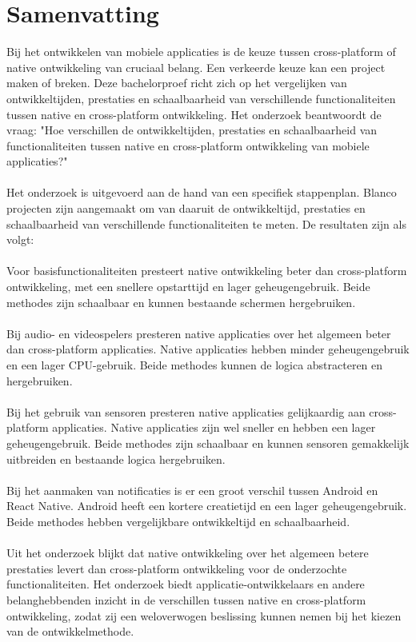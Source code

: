 \chapter{Samenvatting}
Bij het ontwikkelen van mobiele applicaties is de keuze tussen cross-platform of native 
ontwikkeling van cruciaal belang. Een verkeerde keuze kan een project 
maken of breken. Deze bachelorproef richt zich op het vergelijken van 
ontwikkeltijden, prestaties en schaalbaarheid van verschillende functionaliteiten tussen
native en cross-platform ontwikkeling. Het onderzoek beantwoordt de vraag: "Hoe verschillen 
de ontwikkeltijden, prestaties en schaalbaarheid van functionaliteiten tussen native en 
cross-platform ontwikkeling van mobiele applicaties?"
\\\\
Het onderzoek is uitgevoerd aan de hand van een specifiek stappenplan. Blanco projecten 
zijn aangemaakt om van daaruit de ontwikkeltijd, prestaties en schaalbaarheid van verschillende 
functionaliteiten te meten. De resultaten zijn als volgt:
\\\\
Voor basisfunctionaliteiten presteert native ontwikkeling beter dan cross-platform 
ontwikkeling, met een snellere opstarttijd en lager geheugengebruik. Beide methodes 
zijn schaalbaar en kunnen bestaande schermen hergebruiken.
\\\\
Bij audio- en videospelers presteren native applicaties over het algemeen beter dan 
cross-platform applicaties. Native applicaties hebben minder geheugengebruik en een lager 
CPU-gebruik. Beide methodes kunnen de logica abstracteren en hergebruiken.
\\\\
Bij het gebruik van sensoren presteren native applicaties gelijkaardig aan cross-platform applicaties. 
Native applicaties zijn wel sneller en hebben een lager geheugengebruik. Beide methodes zijn 
schaalbaar en kunnen sensoren gemakkelijk uitbreiden en bestaande logica hergebruiken.
\\\\
Bij het aanmaken van notificaties is er een groot verschil tussen Android en React 
Native. Android heeft een kortere creatietijd en een lager geheugengebruik. Beide methodes hebben 
vergelijkbare ontwikkeltijd en schaalbaarheid.
\\\\
Uit het onderzoek blijkt dat native ontwikkeling over het algemeen betere prestaties 
levert dan cross-platform ontwikkeling voor de onderzochte functionaliteiten. Het onderzoek 
biedt applicatie-ontwikkelaars en andere belanghebbenden inzicht in de verschillen tussen 
native en cross-platform ontwikkeling, zodat zij een weloverwogen beslissing kunnen nemen 
bij het kiezen van de ontwikkelmethode.


